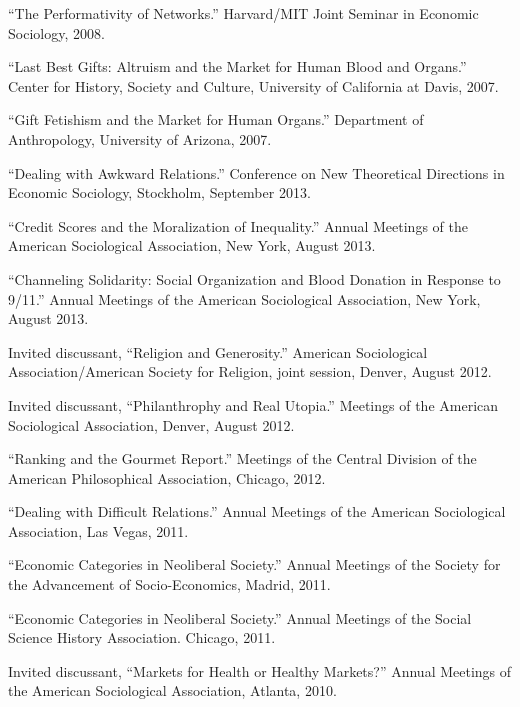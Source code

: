 \documentclass[11pt,article,oneside]{memoir}
\begin{document}
\ind ``The Performativity of Networks.'' Harvard/MIT Joint Seminar in Economic Sociology, 2008. 

\ind ``Last Best Gifts: Altruism and the Market for Human Blood and Organs.'' Center for History, Society and Culture, University of California at Davis, 2007. 

\ind ``Gift Fetishism and the Market for Human Organs.'' Department of Anthropology, University of Arizona, 2007. 


\bigskip


\medskip

\ind ``Dealing with Awkward Relations.'' Conference on New Theoretical Directions in Economic Sociology, Stockholm, September 2013. 

\ind ``Credit Scores and the Moralization of Inequality.'' Annual Meetings of the American Sociological Association, New York, August 2013.
 
\ind ``Channeling Solidarity: Social Organization and Blood Donation in Response to 9/11.'' Annual Meetings of the American Sociological Association, New York, August 2013.

\ind Invited discussant, ``Religion and Generosity.'' American Sociological Association/American Society for Religion, joint session, Denver, August 2012.

\ind Invited discussant, ``Philanthrophy and Real Utopia.'' Meetings of the American Sociological Association, Denver, August 2012. 

\ind ``Ranking and the Gourmet Report.'' Meetings of the Central Division of the American Philosophical Association, Chicago, 2012. 

\ind ``Dealing with Difficult Relations.'' Annual Meetings of the American Sociological Association, Las Vegas, 2011.

\ind ``Economic Categories in Neoliberal Society.'' Annual Meetings of the Society for the Advancement of Socio-Economics, Madrid, 2011.

\ind ``Economic Categories in Neoliberal Society.'' Annual Meetings of the Social Science History Association. Chicago, 2011. 

\ind Invited discussant, ``Markets for Health or Healthy Markets?'' Annual Meetings of the American Sociological Association, Atlanta, 2010. 
\end{document}
